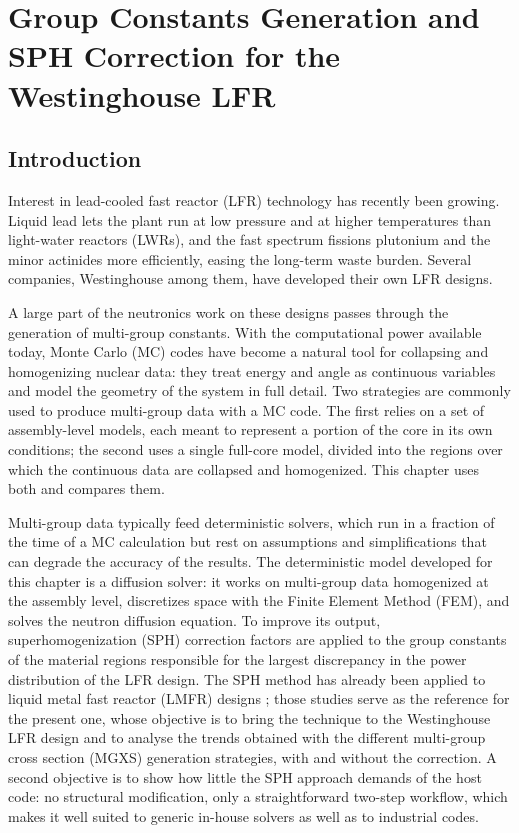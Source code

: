 
\chapter{Group Constants Generation and SPH Correction for the Westinghouse LFR}\label{ch:sph-lfr}

\section{Introduction}

Interest in lead-cooled fast reactor (LFR) technology has recently been growing. Liquid lead lets the plant run at low pressure and at higher temperatures than light-water reactors (LWRs), and the fast spectrum fissions plutonium and the minor actinides more efficiently, easing the long-term waste burden. Several companies, Westinghouse among them, have developed their own LFR designs.

A large part of the neutronics work on these designs passes through the generation of multi-group constants. With the computational power available today, Monte Carlo (MC) codes have become a natural tool for collapsing and homogenizing nuclear data: they treat energy and angle as continuous variables and model the geometry of the system in full detail. Two strategies are commonly used to produce multi-group data with a MC code. The first relies on a set of assembly-level models, each meant to represent a portion of the core in its own conditions; the second uses a single full-core model, divided into the regions over which the continuous data are collapsed and homogenized. This chapter uses both and compares them.

Multi-group data typically feed deterministic solvers, which run in a fraction of the time of a MC calculation but rest on assumptions and simplifications that can degrade the accuracy of the results. The deterministic model developed for this chapter is a diffusion solver: it works on multi-group data homogenized at the assembly level, discretizes space with the Finite Element Method (FEM), and solves the neutron diffusion equation. To improve its output, superhomogenization (SPH) correction factors \cite{Hbert_1980} are applied to the group constants of the material regions responsible for the largest discrepancy in the power distribution of the LFR design. The SPH method has already been applied to liquid metal fast reactor (LMFR) designs \cite{luo2024fullcore_sph,Nikitin_mini_core_models,Rachamin2018}; those studies serve as the reference for the present one, whose objective is to bring the technique to the Westinghouse LFR design and to analyse the trends obtained with the different multi-group cross section (MGXS) generation strategies, with and without the correction. A second objective is to show how little the SPH approach demands of the host code: no structural modification, only a straightforward two-step workflow, which makes it well suited to generic in-house solvers as well as to industrial codes.

